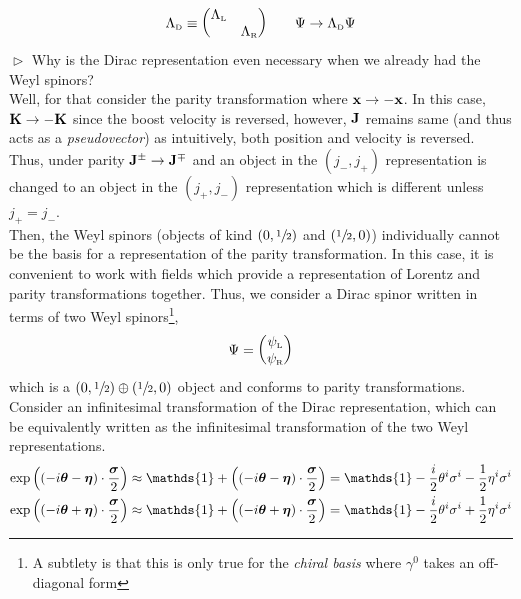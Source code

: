 $$\Lambda_{\text{\tiny D}} \equiv \mqty(\Lambda_{\text{\tiny L}} & \\ & \Lambda_{\text{\tiny R}})\qquad \Psi \to \Lambda_{\text{\tiny D}} \Psi$$
$\vartriangleright$ Why is the Dirac representation even necessary when we already had the Weyl spinors?\\[0.2cm] 
Well, for that consider the parity transformation where $\vb{x}\to -\vb{x}$. In this case, $\vb{K}\to -\vb{K}$ since the boost velocity is reversed, however, $\vb{J}$ remains same (and thus acts as a \textit{pseudovector}) as intuitively, both position and velocity is reversed.\\[0.2cm] Thus, under parity $\vb{J}^{\pm} \to \vb{J}^{\mp}$ and an object in the $(j_-, j_+)$ representation is changed to an object in the $(j_+,j_-)$ representation which is different unless $j_+ = j_-$.\\[0.2cm] Then, the Weyl spinors (objects of kind $\qty(0,\sfrac{1}{2})$ and $\qty(\sfrac{1}{2},0)$) individually cannot be the basis for a representation of the parity transformation. In this case, it is convenient to work with fields which
provide a representation of Lorentz and parity transformations together. Thus, we consider a Dirac spinor written in terms of two Weyl spinors\footnote{A subtlety is that this is only true for the \textit{chiral basis} where $\gamma^0$ takes an off-diagonal form}, 
$$\Psi = \mqty(\psi_{\text {\tiny L}}\\ \psi_{\text{\tiny R}})$$
which is a $\qty(0,\sfrac{1}{2}) \oplus \qty(\sfrac{1}{2},0)$ object and conforms to parity transformations. Consider an infinitesimal transformation of the Dirac representation, which can be equivalently written as the infinitesimal transformation of the two Weyl representations. 
\begin{align*}
  \exp \qty((-i\bs{\theta} -\bs{\eta} )\cdot \frac{\bs{\sigma}}{2}) &\approx \mathds{1} + \qty((-i\bs{\theta} -\bs{\eta} )\cdot \frac{\bs{\sigma}}{2}) = \mathds{1} -\frac{i}{2}\theta^i \sigma^i -\frac{1}{2}\eta^i\sigma^i\\
   \exp \qty((-i\bs{\theta} +\bs{\eta} )\cdot \frac{\bs{\sigma}}{2}) &\approx \mathds{1} + \qty((-i\bs{\theta} +\bs{\eta} )\cdot \frac{\bs{\sigma}}{2})=\mathds{1} -\frac{i}{2}\theta^i \sigma^i +\frac{1}{2}\eta^i\sigma^i
\end{align*}

